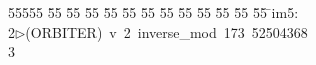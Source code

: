 %
%
\begin{tabbing}
55555 \= 55 \= 55 \= 55 \= 55 \= 55 \= 55 \= 55 \= 55 \= 55 \= 55 \= 55 \= 55 \= \>im5:\\[0pt]
2\>$\triangleright$\>(ORBITER)\ v\ 2\ inverse\_mod\ 173\ 52504368\\[0pt]
3\>\end{tabbing}
